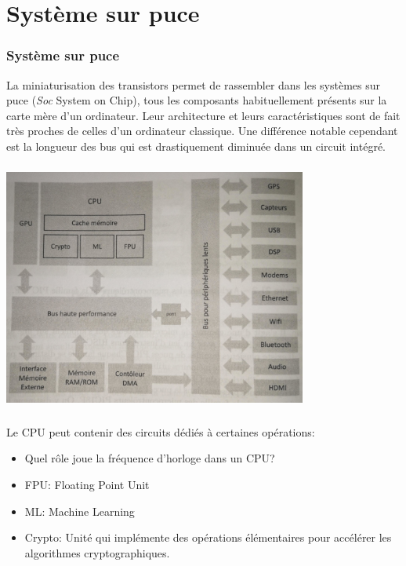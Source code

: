 \documentclass[svgnames,11pt]{beamer}
\begin{document}
\section{Système sur puce}
\begin{frame}
    \frametitle{Système sur puce}

    \begin{aretenir}[]
        La miniaturisation des transistors permet de rassembler dans les systèmes sur puce (\emph{Soc} System on Chip), tous les composants habituellement présents sur la carte mère d'un ordinateur. Leur architecture et leurs caractéristiques sont de fait très proches de celles d'un ordinateur classique. Une différence notable cependant est la longueur des bus qui est drastiquement diminuée dans un circuit intégré.
    \end{aretenir}
\end{frame}
\begin{frame}
    \frametitle{}

    \begin{center}
    \centering
    \includegraphics[width=10cm]{ressources/soc.jpg}
    \label{IMG}
    \end{center}

\end{frame}
\begin{frame}
    \frametitle{}

    Le CPU peut contenir des circuits dédiés à certaines opérations:
    \begin{itemize}
        \item Quel rôle joue la fréquence d'horloge dans un CPU?
        \item FPU: Floating Point Unit
        \item ML: Machine Learning
        \item Crypto: Unité qui implémente des opérations élémentaires pour accélérer les algorithmes cryptographiques.
    \end{itemize}
\end{frame}
\end{document}
